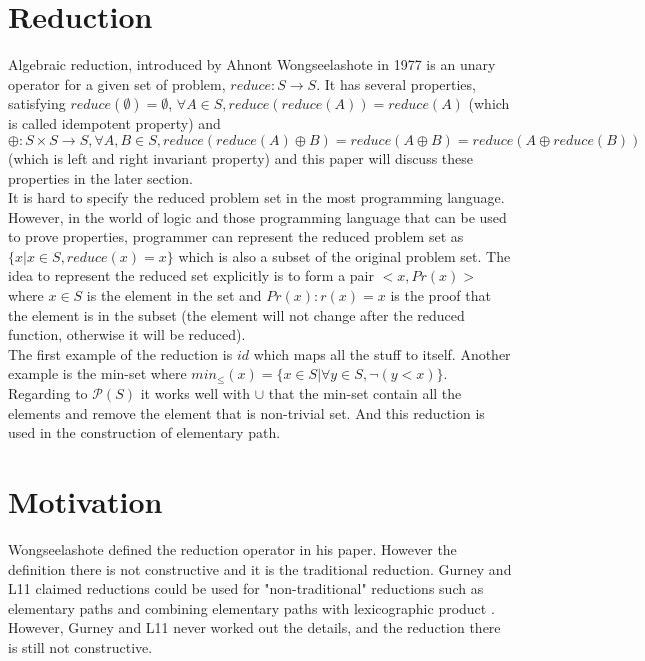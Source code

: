 \documentclass[a4paper,12pt,twoside,openright]{report}
\begin{document}
\section{Reduction}
Algebraic reduction, introduced by Ahnont Wongseelashote in 1977\cite{WONGSEELASHOTE197955} is an unary operator for a given set of problem, $reduce : S \longrightarrow S$. It has several properties, satisfying $reduce(\emptyset) = \emptyset$, $\forall A \in S, reduce(reduce(A)) = reduce(A)$ (which is called idempotent property) and $\oplus : S \times S \rightarrow S, \forall A,B \in S, reduce(reduce(A)\oplus B) = reduce(A\oplus B) = reduce(A\oplus reduce(B))$ (which is left and right invariant property) and this paper will discuss these properties in the later section.\\ 
It is hard to specify the reduced problem set in the most programming language. However, in the world of logic and those programming language that can be used to prove properties, programmer can represent the reduced problem set as $\{x | x \in S, reduce(x) = x\}$ which is also a subset of the original problem set. The idea to represent the reduced set explicitly is to form a pair $<x,Pr(x)>$ where $x \in S$ is the element in the set and $Pr(x) : r(x) = x$ is the proof that the element is in the subset (the element will not change after the reduced function, otherwise it will be reduced). \\
The first example of the reduction is $id$ which maps all the stuff to itself. Another example is the min-set where $min_\leq(x) = \{x \in S | \forall y \in S, \neg(y < x)\}$. Regarding to $\mathcal{P}(S)$ it works well with $\cup$ that the min-set contain all the elements and remove the element that is non-trivial set. And this reduction is used in the construction of elementary path. 


\section{Motivation}
Wongseelashote defined the reduction operator in his paper\cite{WONGSEELASHOTE197955}. However the definition there is not constructive and it is the traditional reduction.
Gurney and L11 claimed reductions could be used for "non-traditional" reductions such as elementary paths and combining elementary paths with lexicographic product \cite{gurney_construction_2010}. 
However, Gurney and L11 never worked out the details, and the reduction there is still not constructive. \\\\
\end{document}
